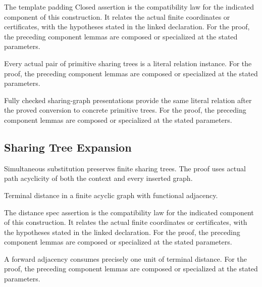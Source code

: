 The template padding Closed assertion is the compatibility law for the indicated component of this construction. It relates the actual finite coordinates or certificates, with the hypotheses stated in the linked declaration.
For the proof, the preceding component lemmas are composed or specialized at the stated parameters.
\par{}

Every actual pair of primitive sharing trees is a literal relation instance.
For the proof, the preceding component lemmas are composed or specialized at the stated parameters.
\par{}

Fully checked sharing-graph presentations provide the same literal relation after the proved conversion to concrete primitive trees.
For the proof, the preceding component lemmas are composed or specialized at the stated parameters.
\par{}

\subsection{Sharing Tree Expansion}
Simultaneous substitution preserves finite sharing trees. The proof uses actual path acyclicity of both the context and every inserted graph.

Terminal distance in a finite acyclic graph with functional adjacency.
\par{}

The distance spec assertion is the compatibility law for the indicated component of this construction. It relates the actual finite coordinates or certificates, with the hypotheses stated in the linked declaration.
For the proof, the preceding component lemmas are composed or specialized at the stated parameters.
\par{}

A forward adjacency consumes precisely one unit of terminal distance.
For the proof, the preceding component lemmas are composed or specialized at the stated parameters.
\par{}

